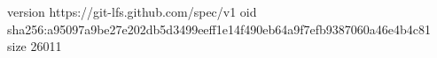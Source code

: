 version https://git-lfs.github.com/spec/v1
oid sha256:a95097a9be27e202db5d3499eeff1e14f490eb64a9f7efb9387060a46e4b4c81
size 26011
